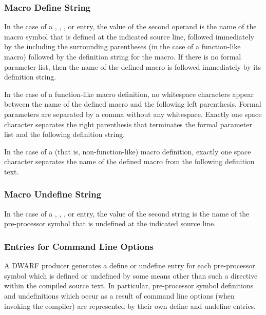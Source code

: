 \subsubsection{Macro Define String}
\label{chap:macrodefinestring}
In the case of a 
\DWMACROdefine{},
\DWMACROdefinestrp{},
\bb
\DWMACROdefinestrx{},
\DWMACROdefinesupfour{} or
\DWMACROdefinesupeight{}
\eb
entry, the value of the
second operand is the name of the macro symbol that is defined
at the indicated source line, followed immediately by the 
including the surrounding parentheses (in
the case of a function-like macro) followed by the definition
string for the macro. If there is no formal parameter list,
then the name of the defined macro is followed immediately by
its definition string.

In the case of a function-like macro definition, no whitespace
characters appear between the name of the defined
macro and the following left parenthesis. Formal parameters
are separated by a comma without any whitespace.
Exactly one space
character separates the right parenthesis that terminates
the formal parameter list and the following definition string.

In the case of a  (that is, non-function-like) macro
definition, exactly one space character separates the
name of the defined macro from the following definition text.

\subsubsection{Macro Undefine String}
\label{chap:macroundefinestring}
In the case of a 
\DWMACROundef{},
\DWMACROundefstrp{},
\bb
\DWMACROundefstrx{},
\DWMACROundefsupfour{} or
\DWMACROundefsupeight{}
\eb
entry, the value of the second string is the name of the pre-processor
symbol that is undefined at the indicated source line.

\subsubsection{Entries for Command Line Options}
\label{chap:entriesforcommandlineoptions}
\DWMACROdefineINDX{}\DWMACROdefinestrpINDX{}\DWMACROdefinestrxINDX
\DWMACROundefINDX{}\DWMACROundefstrpINDX{}\DWMACROundefstrxINDX
A DWARF producer
generates a define or undefine entry for
each pre-processor symbol which is defined or undefined by
some means other than such a directive
within the compiled source text. In particular, pre-processor
symbol definitions and undefinitions which occur as a
result of command line options (when invoking the compiler)
are represented by their own define and
undefine entries.

